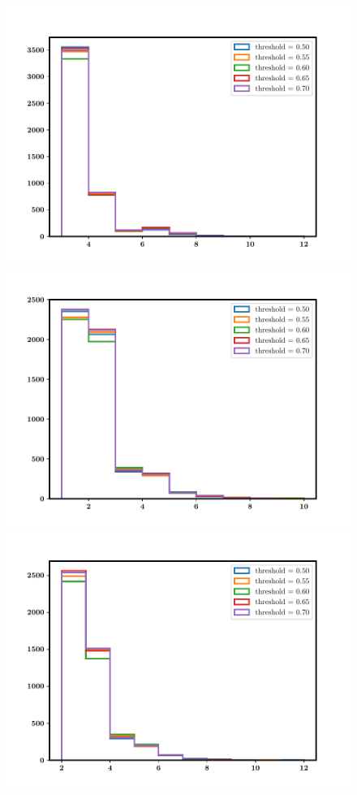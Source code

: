 \begin{figure}
\begin{center}
\includegraphics[scale=0.55]{histogram_of_Npoints}
\includegraphics[scale=0.55]{histogram_of_Msum}
\includegraphics[scale=0.55]{histogram_of_Npairs}

\end{center}
\end{figure}
